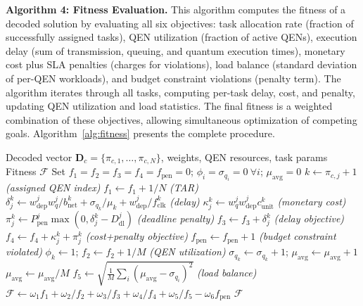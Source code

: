 \documentclass[10pt,twocolumn]{article}
\begin{document}
\textbf{Algorithm 4: Fitness Evaluation.}
This algorithm computes the fitness of a decoded solution by evaluating all six objectives: task allocation rate (fraction of successfully assigned tasks), QEN utilization (fraction of active QENs), execution delay (sum of transmission, queuing, and quantum execution times), monetary cost plus SLA penalties (charges for violations), load balance (standard deviation of per-QEN workloads), and budget constraint violations (penalty term). The algorithm iterates through all tasks, computing per-task delay, cost, and penalty, updating QEN utilization and load statistics. The final fitness is a weighted combination of these objectives, allowing simultaneous optimization of competing goals. Algorithm~\ref{alg:fitness} presents the complete procedure.

\begin{algorithm}[t]
\caption{Fitness Evaluation (Minimize Delay, Energy, Price;\\Constraints: Budget, Deadline, Penalty)}
\label{alg:fitness}
\small
\begin{algorithmic}[1]
\REQUIRE Decoded vector $\mathbf{D}_c=\{\pi_{c,1},\ldots,\pi_{c,N}\}$, weights, QEN resources, task params
\ENSURE Fitness $\mathcal{F}$
\STATE Set $f_1\!=\!f_2\!=\!f_3\!=\!f_4\!=\!f_{\mathrm{pen}}\!=\!0$; $\phi_i\!=\!\sigma_{q_i}\!=\!0\ \forall i$; $\mu_{\mathrm{avg}}\!=\!0$
        \STATE $k\leftarrow\pi_{c,j}+1$ \hfill\textit{(assigned QEN index)}
        \STATE $f_1\leftarrow f_1+1/N$ \hfill\textit{(TAR)}
        \STATE $\delta^k_j\leftarrow w^j_{\mathrm{dep}}w^j_q/b^k_{\mathrm{net}}+\sigma_{q_k}/\mu_k+w^j_{\mathrm{dep}}/f^k_{\mathrm{clk}}$ \hfill\textit{(delay)}
        \STATE $\kappa^k_j\leftarrow w^j_q w^j_{\mathrm{dep}} c^k_{\mathrm{unit}}$ \hfill\textit{(monetary cost)}
        \STATE $\pi^k_j\leftarrow P^j_{\mathrm{pen}}\max(0,\delta^k_j-D^j_{\mathrm{dl}})$ \hfill\textit{(deadline penalty)}
        \STATE $f_3\leftarrow f_3+\delta^k_j$ \hfill\textit{(delay objective)}
        \STATE $f_4\leftarrow f_4+\kappa^k_j+\pi^k_j$ \hfill\textit{(cost+penalty objective)}
            \STATE $f_{\mathrm{pen}}\leftarrow f_{\mathrm{pen}}+1$ \hfill\textit{(budget constraint violated)}
        \ENDIF
            \STATE $\phi_k\leftarrow1$;\; $f_2\leftarrow f_2+1/M$ \hfill\textit{(QEN utilization)}
        \ENDIF
        \STATE $\sigma_{q_k}\leftarrow\sigma_{q_k}+1$;\; $\mu_{\mathrm{avg}}\leftarrow\mu_{\mathrm{avg}}+1$
    \ENDIF
\ENDFOR
\STATE $\mu_{\mathrm{avg}}\leftarrow\mu_{\mathrm{avg}}/M$
\STATE $f_5\leftarrow\sqrt{\frac{1}{M}\sum_i(\mu_{\mathrm{avg}}-\sigma_{q_i})^2}$ \hfill\textit{(load balance)}
\STATE $\mathcal{F}\leftarrow\omega_1 f_1+\omega_2/f_2+\omega_3/f_3+\omega_4/f_4+\omega_5/f_5-\omega_6 f_{\mathrm{pen}}$
\RETURN $\mathcal{F}$
\end{algorithmic}
\end{algorithm}
\end{document}
